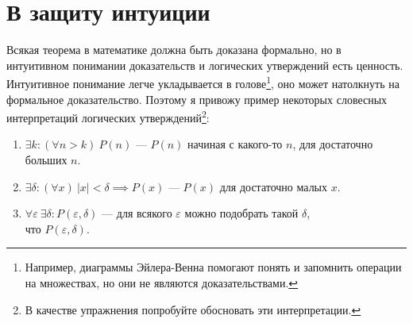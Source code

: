 \part{В защиту интуиции}

Всякая теорема в математике должна быть доказана формально,
но в интуитивном понимании доказательств и логических утверждений есть ценность.
Интуитивное понимание легче укладывается в голове\footnote{Например, диаграммы
	Эйлера-Венна помогают понять и запомнить операции на множествах, но они
	не являются доказательствами.},
оно может натолкнуть на формальное доказательство. Поэтому я привожу пример
некоторых словесных интерпретаций логических утверждений\footnote{В качестве
	упражнения попробуйте обосновать эти интерпретации.}:
\begin{enumerate}
	\item{}$\exists k:(\forall n>k)~P(n)$ --- $P(n)$ начиная с какого-то $n$,
	для достаточно больших $n$.
	\item{}$\exists \delta:(\forall x)~|x|<\delta\implies P(x)$ --- $P(x)$ для
	достаточно малых $x$.
	\item{}$\forall \varepsilon~\exists \delta:P(\varepsilon,\delta)$ ---
	для всякого $\varepsilon$ можно подобрать такой $\delta$,\\что $P(\varepsilon,\delta)$.
\end{enumerate}
